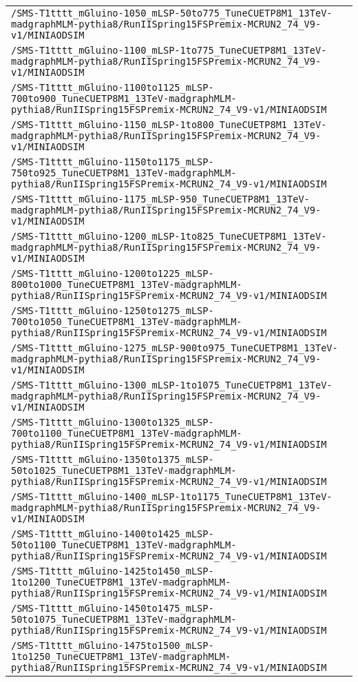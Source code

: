 \begin{center}
\begin{tabular}{l}
\verb!/SMS-T1tttt_mGluino-1050_mLSP-50to775_TuneCUETP8M1_13TeV-madgraphMLM-pythia8/RunIISpring15FSPremix-MCRUN2_74_V9-v1/MINIAODSIM! \tabularnewline
\verb!/SMS-T1tttt_mGluino-1100_mLSP-1to775_TuneCUETP8M1_13TeV-madgraphMLM-pythia8/RunIISpring15FSPremix-MCRUN2_74_V9-v1/MINIAODSIM! \tabularnewline
\verb!/SMS-T1tttt_mGluino-1100to1125_mLSP-700to900_TuneCUETP8M1_13TeV-madgraphMLM-pythia8/RunIISpring15FSPremix-MCRUN2_74_V9-v1/MINIAODSIM! \tabularnewline
\verb!/SMS-T1tttt_mGluino-1150_mLSP-1to800_TuneCUETP8M1_13TeV-madgraphMLM-pythia8/RunIISpring15FSPremix-MCRUN2_74_V9-v1/MINIAODSIM! \tabularnewline
\verb!/SMS-T1tttt_mGluino-1150to1175_mLSP-750to925_TuneCUETP8M1_13TeV-madgraphMLM-pythia8/RunIISpring15FSPremix-MCRUN2_74_V9-v1/MINIAODSIM! \tabularnewline
\verb!/SMS-T1tttt_mGluino-1175_mLSP-950_TuneCUETP8M1_13TeV-madgraphMLM-pythia8/RunIISpring15FSPremix-MCRUN2_74_V9-v1/MINIAODSIM! \tabularnewline
\verb!/SMS-T1tttt_mGluino-1200_mLSP-1to825_TuneCUETP8M1_13TeV-madgraphMLM-pythia8/RunIISpring15FSPremix-MCRUN2_74_V9-v1/MINIAODSIM! \tabularnewline
\verb!/SMS-T1tttt_mGluino-1200to1225_mLSP-800to1000_TuneCUETP8M1_13TeV-madgraphMLM-pythia8/RunIISpring15FSPremix-MCRUN2_74_V9-v1/MINIAODSIM! \tabularnewline
\verb!/SMS-T1tttt_mGluino-1250to1275_mLSP-700to1050_TuneCUETP8M1_13TeV-madgraphMLM-pythia8/RunIISpring15FSPremix-MCRUN2_74_V9-v1/MINIAODSIM! \tabularnewline
\verb!/SMS-T1tttt_mGluino-1275_mLSP-900to975_TuneCUETP8M1_13TeV-madgraphMLM-pythia8/RunIISpring15FSPremix-MCRUN2_74_V9-v1/MINIAODSIM! \tabularnewline
\verb!/SMS-T1tttt_mGluino-1300_mLSP-1to1075_TuneCUETP8M1_13TeV-madgraphMLM-pythia8/RunIISpring15FSPremix-MCRUN2_74_V9-v1/MINIAODSIM! \tabularnewline
\verb!/SMS-T1tttt_mGluino-1300to1325_mLSP-700to1100_TuneCUETP8M1_13TeV-madgraphMLM-pythia8/RunIISpring15FSPremix-MCRUN2_74_V9-v1/MINIAODSIM! \tabularnewline
\verb!/SMS-T1tttt_mGluino-1350to1375_mLSP-50to1025_TuneCUETP8M1_13TeV-madgraphMLM-pythia8/RunIISpring15FSPremix-MCRUN2_74_V9-v1/MINIAODSIM! \tabularnewline
\verb!/SMS-T1tttt_mGluino-1400_mLSP-1to1175_TuneCUETP8M1_13TeV-madgraphMLM-pythia8/RunIISpring15FSPremix-MCRUN2_74_V9-v1/MINIAODSIM! \tabularnewline
\verb!/SMS-T1tttt_mGluino-1400to1425_mLSP-50to1100_TuneCUETP8M1_13TeV-madgraphMLM-pythia8/RunIISpring15FSPremix-MCRUN2_74_V9-v1/MINIAODSIM! \tabularnewline
\verb!/SMS-T1tttt_mGluino-1425to1450_mLSP-1to1200_TuneCUETP8M1_13TeV-madgraphMLM-pythia8/RunIISpring15FSPremix-MCRUN2_74_V9-v1/MINIAODSIM! \tabularnewline
\verb!/SMS-T1tttt_mGluino-1450to1475_mLSP-50to1075_TuneCUETP8M1_13TeV-madgraphMLM-pythia8/RunIISpring15FSPremix-MCRUN2_74_V9-v1/MINIAODSIM! \tabularnewline
\verb!/SMS-T1tttt_mGluino-1475to1500_mLSP-1to1250_TuneCUETP8M1_13TeV-madgraphMLM-pythia8/RunIISpring15FSPremix-MCRUN2_74_V9-v1/MINIAODSIM! \tabularnewline

\end{tabular}
\end{center}
